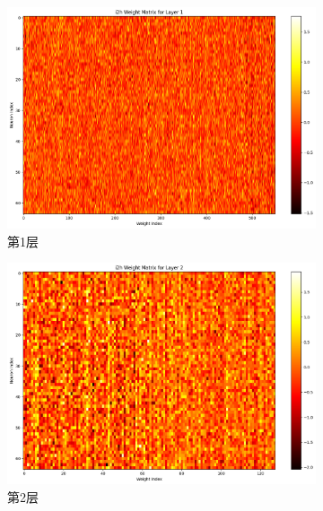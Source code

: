 \begin{figure}[H]
    \centering
    \begin{subfigure}{0.3\textwidth}
        \includegraphics[width=\linewidth]{../output/lstm/with scheduler/i2h Weight Matrix for Layer 1.png}
        \caption{第1层}
        \label{fig:lstmweightmatrixforlayer1withscheduler}
    \end{subfigure}
    \hfill
    \begin{subfigure}{0.3\textwidth}
        \includegraphics[width=\linewidth]{../output/lstm/with scheduler/i2h Weight Matrix for Layer 2.png}
        \caption{第2层}
        \label{fig:lstmweightmatrixforlayer2withscheduler}
    \end{subfigure}
    \hfill
    \begin{subfigure}{0.3\textwidth}

\end{subfigure}
\end{figure}
